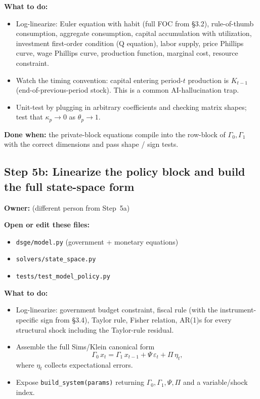 \documentclass[11pt]{article}
\newcommand{\nameblank}{\underline{\hspace{4.5cm}}}
\begin{document}
\textbf{What to do:}
\begin{itemize}
    \item Log-linearize: Euler equation with habit (full FOC from \S3.2), rule-of-thumb consumption, aggregate consumption, capital accumulation with utilization, investment first-order condition (Q equation), labor supply, price Phillips curve, wage Phillips curve, production function, marginal cost, resource constraint.
    \item Watch the timing convention: capital entering period-$t$ production is $K_{t-1}$ (end-of-previous-period stock). This is a common AI-hallucination trap.
    \item Unit-test by plugging in arbitrary coefficients and checking matrix shapes; test that $\kappa_p\to 0$ as $\theta_p\to 1$.
\end{itemize}

\textbf{Done when:} the private-block equations compile into the row-block of $\Gamma_0, \Gamma_1$ with the correct dimensions and pass shape / sign tests.

\subsection{Step 5b: Linearize the policy block and build the full state-space form}
\textbf{Owner:} \nameblank{} (different person from Step~5a)

\textbf{Open or edit these files:}
\begin{itemize}
    \item \texttt{dsge/model.py} (government + monetary equations)
    \item \texttt{solvers/state\_space.py}
    \item \texttt{tests/test\_model\_policy.py}
\end{itemize}

\textbf{What to do:}
\begin{itemize}
    \item Log-linearize: government budget constraint, fiscal rule (with the instrument-specific sign from \S3.4), Taylor rule, Fisher relation, AR(1)s for every structural shock including the Taylor-rule residual.
    \item Assemble the full Sims/Klein canonical form
    \[
        \Gamma_0 \, x_t = \Gamma_1 \, x_{t-1} + \Psi \, \varepsilon_t + \Pi \, \eta_t,
    \]
    where $\eta_t$ collects expectational errors.
    \item Expose \texttt{build\_system(params)} returning $\Gamma_0, \Gamma_1, \Psi, \Pi$ and a variable/shock index.
\end{itemize}
\end{document}
